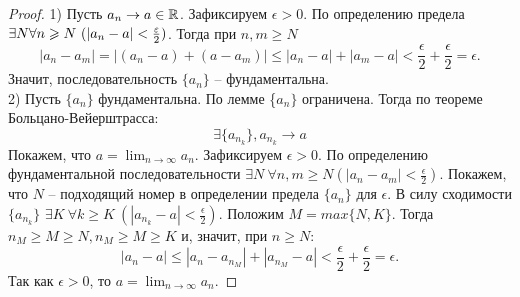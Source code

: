     \begin{proof}
        1) Пусть $a_{n} \rightarrow a \in \R$. Зафиксируем $\epsilon > 0$. По определению предела $\exists N \\ \forall n \geq N \ (|a_{n} - a| < \frac{\epsilon}{2})$. Тогда при $n, m \geq N$
        \[|a_{n} - a_{m}| = |(a_{n} - a) + (a - a_{m})| \leq |a_{n} - a| + |a_{m} - a| < \frac{\epsilon}{2} + \frac{\epsilon}{2} = \epsilon.\]
        Значит, последовательность $\{a_{n}\}$ -- фундаментальна.
        \\
        2) Пусть $\{a_{n}\}$ фундаментальна. По лемме \{$a_{n}\}$ ограничена. Тогда по теореме Больцано-Вейерштрасса:
        \[\exists \{a_{n_{k}}\}, a_{n_{k}} \rightarrow a\]
        Покажем, что $a = \lim_{n \to \infty} a_{n}$. Зафиксируем $\epsilon > 0$. По определению фундаментальной последовательности $\exists N \ \forall n,m \geq N (|a_{n} - a_{m}| < \frac{\epsilon}{2})$. Покажем, что $N$ -- подходящий номер в определении предела $\{a_{n}\}$ для $\epsilon$. В силу сходимости $\{a_{n_{k}}\}$ $\exists K \ \forall k \geq K \ (|a_{n_{k}} - a| < \frac{\epsilon}{2})$. Положим $M = max\{N, K\}$. Тогда $n_{M} \geq M \geq N, n_{M} \geq M \geq K$ и, значит, при $n \geq N$:
        \[|a_{n} - a| \leq |a_{n} - a_{n_{M}}| + |a_{n_{M}} - a| < \frac{\epsilon}{2} + \frac{\epsilon}{2} = \epsilon.\]
        Так как $\epsilon > 0$, то $a = \lim_{n \to \infty} a_{n}$.
    \end{proof}
